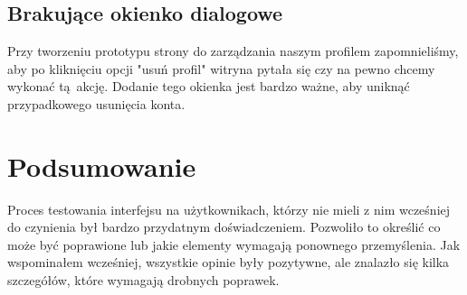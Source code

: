 \documentclass{article}
\begin{document}
\subsection{Brakujące okienko dialogowe}
Przy tworzeniu prototypu strony do zarządzania naszym profilem zapomnieliśmy, aby po kliknięciu opcji "usuń profil" witryna pytała się czy na pewno chcemy wykonać tą akcję.
Dodanie tego okienka jest bardzo ważne, aby uniknąć przypadkowego usunięcia konta.

\section{Podsumowanie}
Proces testowania interfejsu na użytkownikach, którzy nie mieli z nim wcześniej do czynienia był bardzo przydatnym doświadczeniem. Pozwoliło to określić co może być poprawione
lub jakie elementy wymagają ponownego przemyślenia. Jak wspominałem wcześniej, wszystkie opinie były pozytywne, ale znalazło się kilka szczegółów, które wymagają drobnych poprawek.
\end{document}
